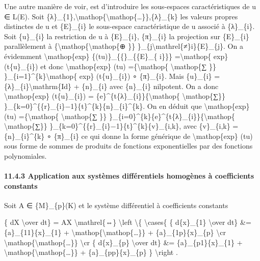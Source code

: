 \documentclass[]{article}
\begin{document}
Une autre manière de voir, est d'introduire les sous-espaces
caractéristiques de u ∈ L(E). Soit
\{λ\}\_\{1\},\textbackslash{}mathop\{\textbackslash{}mathop\{\ldots{}\}\},\{λ\}\_\{k\}
les valeurs propres distinctes de u et \{E\}\_\{i\} le sous-espace
caractéristique de u associé à \{λ\}\_\{i\}. Soit \{u\}\_\{i\} la
restriction de u à \{E\}\_\{i\}, \{π\}\_\{i\} la projection sur
\{E\}\_\{i\} parallèlement à
\{\textbackslash{}mathop\{\textbackslash{}mathop\{⊕ \}\}
\}\_\{j\textbackslash{}mathrel\{≠\}i\}\{E\}\_\{j\}. On a évidemment
\textbackslash{}mathop\{exp\} \{(tu)\}\_\{\{\textbar{}\}\_\{\{E\}\_\{
i\}\}\} =\textbackslash{}mathop\{ exp\} (t\{u\}\_\{i\}) et donc
\textbackslash{}mathop\{exp\} (tu) =\{\textbackslash{}mathop\{
\textbackslash{}mathop\{∑ \}\}
\}\_\{i=1\}\^{}\{k\}\textbackslash{}mathop\{ exp\} (t\{u\}\_\{i\}) ∘
\{π\}\_\{i\}. Mais \{u\}\_\{i\} =
\{λ\}\_\{i\}\textbackslash{}mathrm\{Id\} + \{n\}\_\{i\} avec
\{n\}\_\{i\} nilpotent. On a donc \textbackslash{}mathop\{exp\}
(t\{u\}\_\{i\}) = \{e\}\^{}\{t\{λ\}\_\{i\}\}\{\textbackslash{}mathop\{
\textbackslash{}mathop\{∑\}\}
\}\_\{k=0\}\^{}\{\{r\}\_\{i\}−1\}\{t\}\^{}\{k\}\{n\}\_\{i\}\^{}\{k\}. On
en déduit que \textbackslash{}mathop\{exp\} (tu)
=\{\textbackslash{}mathop\{ \textbackslash{}mathop\{∑ \}\}
\}\_\{i=0\}\^{}\{k\}\{e\}\^{}\{t\{λ\}\_\{i\}\}\{\textbackslash{}mathop\{
\textbackslash{}mathop\{∑\}\}
\}\_\{k=0\}\^{}\{\{r\}\_\{i\}−1\}\{t\}\^{}\{k\}\{v\}\_\{i,k\}, avec
\{v\}\_\{i,k\} = \{n\}\_\{i\}\^{}\{k\} ∘ \{π\}\_\{i\} ce qui donne la
forme générique de \textbackslash{}mathop\{exp\} (tu) sous forme de
sommes de produits de fonctions exponentielles par des fonctions
polynomiales.

\paragraph{11.4.3 Application aux systèmes différentiels homogènes à
coefficients constants}

Soit A ∈ \{M\}\_\{p\}(K) et le système différentiel à coefficients
constants

\{ dX \textbackslash{}over dt\} = AX \textbackslash{}mathrel\{⇔\}
\textbackslash{}left \textbackslash{}\{ \textbackslash{}cases\{ \{
d\{x\}\_\{1\} \textbackslash{}over dt\} \&= \{a\}\_\{11\}\{x\}\_\{1\} +
\textbackslash{}mathop\{\textbackslash{}mathop\{\ldots{}\}\} +
\{a\}\_\{1p\}\{x\}\_\{p\} \textbackslash{}cr
\textbackslash{}mathop\{\textbackslash{}mathop\{\ldots{}\}\}
\textbackslash{}cr \{ d\{x\}\_\{p\} \textbackslash{}over dt\} \&=
\{a\}\_\{p1\}\{x\}\_\{1\} +
\textbackslash{}mathop\{\textbackslash{}mathop\{\ldots{}\}\} +
\{a\}\_\{pp\}\{x\}\_\{p\} \} \textbackslash{}right .
\end{document}
